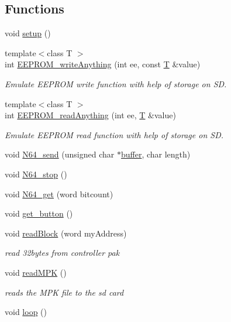 \subsection*{Functions}
\begin{DoxyCompactItemize}
\item 
void \hyperlink{Uno__N64__Controller__Pak__Reader_8ino_a4fc01d736fe50cf5b977f755b675f11d}{setup} ()
\item 
{\footnotesize template$<$class T $>$ }\\int \hyperlink{Uno__N64__Controller__Pak__Reader_8ino_a396fbd5a2d6b5b3f3dac10fec0bdd780}{E\-E\-P\-R\-O\-M\-\_\-write\-Anything} (int ee, const \hyperlink{Yun__Log__BatteryDisCharging_8ino_a1e59dd36aafb310776e617456b9415b5}{T} \&value)
\begin{DoxyCompactList}\small\item\em Emulate E\-E\-P\-R\-O\-M write function with help of storage on S\-D. \end{DoxyCompactList}\item 
{\footnotesize template$<$class T $>$ }\\int \hyperlink{Uno__N64__Controller__Pak__Reader_8ino_a15fc5dc360b561e03651fd94aa72800f}{E\-E\-P\-R\-O\-M\-\_\-read\-Anything} (int ee, \hyperlink{Yun__Log__BatteryDisCharging_8ino_a1e59dd36aafb310776e617456b9415b5}{T} \&value)
\begin{DoxyCompactList}\small\item\em Emulate E\-E\-P\-R\-O\-M read function with help of storage on S\-D. \end{DoxyCompactList}\item 
void \hyperlink{Uno__N64__Controller__Pak__Reader_8ino_a00da8f9213ddf7c940aa5c53a4a058ad}{N64\-\_\-send} (unsigned char $\ast$\hyperlink{ThroughSerial_2RemoteWorker_2DeviceGeneric_2DeviceGeneric_8cpp_ad1a11643f6815853e0558861103c9a60}{buffer}, char length)
\item 
void \hyperlink{Uno__N64__Controller__Pak__Reader_8ino_a73e605f956703e46287c23a71085e3eb}{N64\-\_\-stop} ()
\item 
void \hyperlink{Uno__N64__Controller__Pak__Reader_8ino_ae45220068299673854b81d849fa7d05a}{N64\-\_\-get} (word bitcount)
\item 
void \hyperlink{Uno__N64__Controller__Pak__Reader_8ino_a0f6d3c63311a1be3a7230f4c15531f03}{get\-\_\-button} ()
\item 
void \hyperlink{Uno__N64__Controller__Pak__Reader_8ino_a19e305a522fff21d3e2409e765ab5671}{read\-Block} (word my\-Address)
\begin{DoxyCompactList}\small\item\em read 32bytes from controller pak \end{DoxyCompactList}\item 
void \hyperlink{Uno__N64__Controller__Pak__Reader_8ino_a1a493711903f7ede98cd0f5a81ba0c24}{read\-M\-P\-K} ()
\begin{DoxyCompactList}\small\item\em reads the M\-P\-K file to the sd card \end{DoxyCompactList}\item 
void \hyperlink{Uno__N64__Controller__Pak__Reader_8ino_afe461d27b9c48d5921c00d521181f12f}{loop} ()
\end{DoxyCompactItemize}
